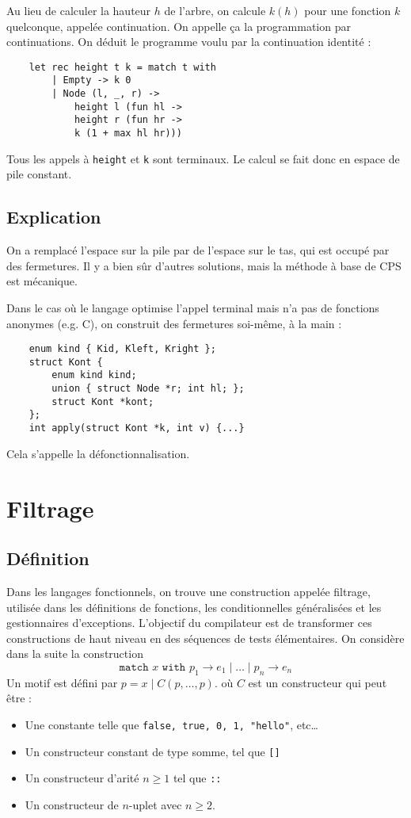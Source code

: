 \documentclass{cours}
\begin{document}
Au lieu de calculer la hauteur $h$ de l'arbre, on calcule $k(h)$ pour une fonction $k$ quelconque, appelée continuation. On appelle ça la programmation par continuations. On déduit le programme voulu par la continuation identité :

\begin{verbatim}
    let rec height t k = match t with
        | Empty -> k 0
        | Node (l, _, r) ->
            height l (fun hl ->
            height r (fun hr ->
            k (1 + max hl hr)))
\end{verbatim}
Tous les appels à \texttt{height} et \texttt{k} sont terminaux. Le calcul se fait donc en espace de pile constant.

\subsection{Explication}
On a remplacé l'espace sur la pile par de l'espace sur le tas, qui est occupé par des fermetures. Il y a bien sûr d'autres solutions, mais la méthode à base de CPS est mécanique.

Dans le cas où le langage optimise l'appel terminal mais n'a pas de fonctions anonymes (e.g. C), on construit des fermetures soi-même, à la main :
\begin{verbatim}
    enum kind { Kid, Kleft, Kright };
    struct Kont {
        enum kind kind;
        union { struct Node *r; int hl; };
        struct Kont *kont;
    };
    int apply(struct Kont *k, int v) {...}
\end{verbatim}

Cela s'appelle la défonctionnalisation.

\section{Filtrage}
\subsection{Définition}
Dans les langages fonctionnels, on trouve une construction appelée filtrage, utilisée dans les définitions de fonctions, les conditionnelles généralisées et les gestionnaires d'exceptions. L'objectif du compilateur est de transformer ces constructions de haut niveau en des séquences de tests élémentaires. On considère dans la suite la construction
\[
    \texttt{match } x \texttt{ with } p_{1} \rightarrow e_{1} \mid \ldots \mid p_{n} \rightarrow e_{n}
\]
Un motif est défini par $p = x \mid C(p, \ldots, p)$. où $C$ est un constructeur qui peut être :
\begin{itemize}
    \item Une constante telle que \texttt{false, true, 0, 1, "hello"}, etc\dots
    \item Un constructeur constant de type somme, tel que \texttt{[]}
    \item Un constructeur d'arité $n \geq 1$ tel que \texttt{::}
    \item Un constructeur de $n$-uplet avec $n \geq 2$.
\end{itemize}
\end{document}
